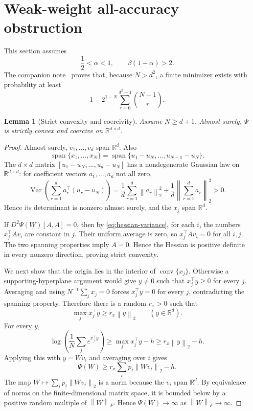 \documentclass[11pt]{article}
\newtheorem{lemma}[lemma]{Lemma}
\theoremstyle{definition}
\newcommand{\R}{\mathbb R}
\newcommand{\Var}{\operatorname{Var}}
\newcommand{\norm}[1]{\left\lVert #1\right\rVert_2}
\newcommand{\normF}[1]{\left\lVert #1\right\rVert_F}
\begin{document}
\section{Weak-weight all-accuracy obstruction}

This section assumes
\begin{equation}
 \frac12<\alpha<1,
 \qquad \beta(1-\alpha)>2.
 \label{eq:weak-regime}
\end{equation}
The companion note~\cite{companion} proves that, because $N>d^2$, a finite minimizer
exists with probability at least
\begin{equation}
 1-2^{1-N}\sum_{r=0}^{d^2-1}\binom{N-1}{r}.
 \label{eq:companion-prob}
\end{equation}

\begin{lemma}[Strict convexity and coercivity]
\label{lem:strict-coercive}
Assume $N\geq d+1$.  Almost surely, $\Psi$ is strictly convex and
coercive on $\R^{d\times d}$.
\end{lemma}

\begin{proof}
Almost surely, $v_1,\ldots,v_d$ span $\R^d$.  Also
\[
 \operatorname{span}\{x_1,\ldots,x_N\}
 =\operatorname{span}\{u_1-u_N,\ldots,u_{N-1}-u_N\}.
\]
The $d\times d$ matrix
$[u_1-u_N,\ldots,u_d-u_N]$ has a nondegenerate Gaussian law on
$\R^{d\times d}$: for coefficient vectors $a_1,\ldots,a_d$ not all
zero,
\[
 \Var\!\left(\sum_{r=1}^d a_r^\top(u_r-u_N)\right)
 =\frac1d\sum_{r=1}^d\norm{a_r}^2
 +\frac1d\norm{\sum_{r=1}^d a_r}^2>0.
\]
Hence its determinant is nonzero almost surely, and the $x_j$ span
$\R^d$.

If $D^2\Psi(W)[A,A]=0$, then by \eqref{eq:hessian-variance}, for each
$i$, the numbers $x_j^\top Av_i$ are constant in $j$.  Their uniform
average is zero, so $x_j^\top Av_i=0$ for all $i,j$.  The two spanning
properties imply $A=0$.  Hence the Hessian is positive definite in
every nonzero direction, proving strict convexity.

We next show that the origin lies in the interior of
$\operatorname{conv}\{x_j\}$.  Otherwise a supporting-hyperplane
argument would give $y\neq0$ such that $x_j^\top y\geq0$ for every
$j$.  Averaging and using $N^{-1}\sum_jx_j=0$ forces
$x_j^\top y=0$ for every $j$, contradicting the spanning property.
Therefore there is a random $r_x>0$ such that
\[
 \max_j x_j^\top y\geq r_x\norm y
 \qquad(y\in\R^d).
\]
For every $y$,
\[
 \log\left(\frac1N\sum_j e^{x_j^\top y}\right)
 \geq\max_jx_j^\top y-h
 \geq r_x\norm y-h.
\]
Applying this with $y=Wv_i$ and averaging over $i$ gives
\[
 \Psi(W)\geq r_x\sum_i p_i\norm{Wv_i}-h.
\]
The map $W\mapsto\sum_i p_i\norm{Wv_i}$ is a norm because the $v_i$
span $\R^d$.  By equivalence of norms on the finite-dimensional matrix
space, it is bounded below by a positive random multiple of
$\normF{W}$.  Hence $\Psi(W)\to\infty$ as $\normF{W}\to\infty$.
\end{proof}
\end{document}
